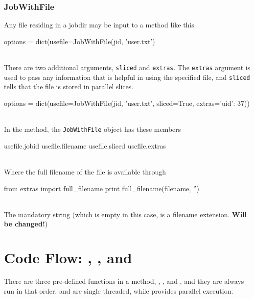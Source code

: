 \subsubsection*{JobWithFile}
Any file residing in a jobdir may be input to a method like this
\\
\begin{pythonBEG}
  options = dict(usefile=JobWithFile(jid, 'user.txt')
\end{pythonBEG}
\\
There are two additional arguments, \texttt{sliced} and
\texttt{extras}.  The \texttt{extras} argument is used to pass any
information that is helpful in using the specified file, and
\texttt{sliced} tells that the file is stored in parallel slices.
\\
\begin{pythonMID}
options = dict(usefile=JobWithFile(jid, 'user.txt', sliced=True, extras={'uid': 37}))
\end{pythonMID}
\\
In the method, the \texttt{JobWithFile} object has these members
\\
\begin{pythonEND}
  usefile.jobid
  usefile.filename
  usefile.sliced
  usefile.extras
\end{pythonEND}
\\
Where the full filename of the file is available through
\\
\begin{python}
from extras import full_filename
print full_filename(filename, '')
\end{python}
\\
The mandatory string (which is empty in this case, is a filename
extension.  \textbf{Will be changed!})





\newpage
\section{Code Flow:  \prepare, \analysis, and \synthesis}

There are three pre-defined functions in a method, \prepare,
\analysis, and \synthesis, and they are always run in that order.
\prepare and \synthesis are single threaded, while \analysis provides
parallel execution.


